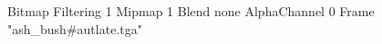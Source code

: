 {Bitmap
	{Filtering 1}
	{Mipmap 1}
	{Blend none}
	{AlphaChannel 0}
	{Frame "ash_bush#autlate.tga"}
}
